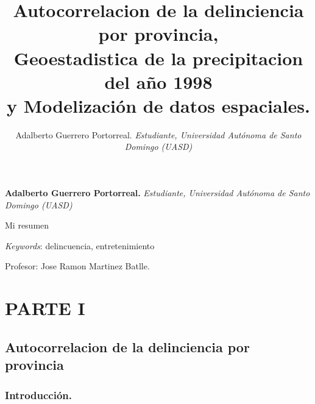 \documentclass[11pt,]{article}
\title{Autocorrelacion de la delinciencia por provincia,\\
Geoestadistica de la precipitacion del año 1998\\
y Modelización de datos espaciales.  }
\author{\Large Adalberto Guerrero Portorreal.\vspace{0.05in} \newline\normalsize\emph{Estudiante, Universidad Autónoma de Santo Domingo (UASD)}  }
\date{}
\newcommand*{\authorfont}{\fontfamily{phv}\selectfont}
\renewenvironment{abstract}
 {{%
    \setlength{\leftmargin}{0mm}
    \setlength{\rightmargin}{\leftmargin}%
  }%
  \relax}
 {\endlist}
\begin{document}
	
%

{%
\setlength{\parindent}{0pt}
\thispagestyle{plain}
{\fontsize{18}{20}\selectfont\raggedright 
\maketitle  %

}

{
   \vskip 13.5pt\relax \normalsize\fontsize{11}{12} 
\textbf{\authorfont Adalberto Guerrero Portorreal.} \hskip 15pt \emph{\small Estudiante, Universidad Autónoma de Santo Domingo (UASD)}   

}

}








\begin{abstract}

    \hbox{\vrule height .2pt width 39.14pc}

    \vskip 8.5pt %

\noindent Mi resumen


\vskip 8.5pt \noindent \emph{Keywords}: delincuencia, entretenimiento \par

    \hbox{\vrule height .2pt width 39.14pc}



\end{abstract}


\vskip 6.5pt


\noindent  Profesor: Jose Ramon Martinez Batlle.

\section{PARTE I}\label{parte-i}

\subsection{Autocorrelacion de la delinciencia por
provincia}\label{autocorrelacion-de-la-delinciencia-por-provincia}

\subsubsection{Introducción.}\label{introducciuxf3n.}
\end{document}
